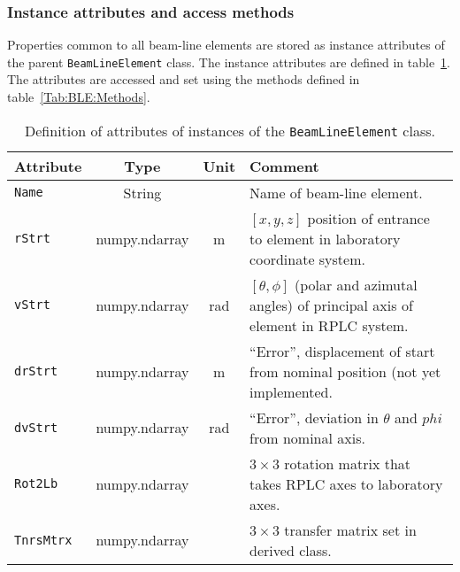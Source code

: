 \subsubsection{Instance attributes and access methods}
Properties common to all beam-line elements are stored as instance
attributes of the parent \texttt{BeamLineElement} class.
The instance attributes are defined in table~\ref{Tab:BLE:Attributes}.
The attributes are accessed and set using the methods defined in
table~\ref{Tab:BLE:Methods}.
\begin{table}
  \caption{
    Definition of attributes of instances of
    the \texttt{BeamLineElement} class. 
  }
  \label{Tab:BLE:Attributes}
  \begin{center}
    \begin{tabular}{|l|c|c|p{10cm}|}
      \hline
      \textbf{Attribute} & \textbf{Type} & \textbf{Unit} & \textbf{Comment}                                                               \\
      \hline
      \texttt{Name}     & String        &     & Name of beam-line element.                                                                \\
      \texttt{rStrt}    & numpy.ndarray & m   & $[x, y, z]$ position of entrance to element in laboratory coordinate system.              \\
      \texttt{vStrt}    & numpy.ndarray & rad & $[\theta, \phi]$ (polar and azimutal angles) of principal axis of element in RPLC system. \\
      \texttt{drStrt}   & numpy.ndarray & m   & ``Error'', displacement of start from nominal position (not yet implemented.              \\
      \texttt{dvStrt}   & numpy.ndarray & rad & ``Error'', deviation in $\theta$ and $phi$ from nominal axis.                             \\
      \texttt{Rot2Lb}   & numpy.ndarray &     & $3\times3$ rotation matrix that takes RPLC axes to laboratory axes.                       \\
      \texttt{TnrsMtrx} & numpy.ndarray &     & $3\times3$ transfer matrix set in derived class.                                          \\
      \hline
    \end{tabular}
  \end{center}
\end{table}
